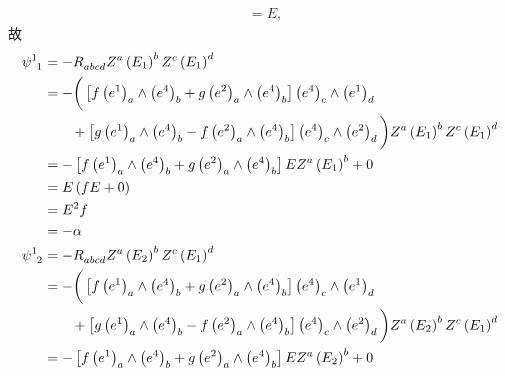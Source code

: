 \begin{xiti}
\begin{zm}
\begin{equation*}
\begin{split}
				&= E,
			\end{split}
		\end{equation*}
		故
		\begin{align*}
			\tensor{\psi}{^1_1} &= - \tensor{R}{_a_b_c_d} \tensor{Z}{^a} \tensor{\left( E_1 \right)}{^b} \tensor{Z}{^c} \tensor{\left( E_1 \right)}{^d}\\
			&= - \bigg( \left[ f \tensor{\left( e^1 \right)}{_a} \wedge \tensor{\left( e^4 \right)}{_b} + g \tensor{\left( e^2 \right)}{_a} \wedge \tensor{\left( e^4 \right)}{_b} \right] \tensor{\left( e^4 \right)}{_c} \wedge \tensor{\left( e^1 \right)}{_d}\\
			&\qquad {}+ \left[ g \tensor{\left( e^1 \right)}{_a} \wedge \tensor{\left( e^4 \right)}{_b} - f \tensor{\left( e^2 \right)}{_a} \wedge \tensor{\left( e^4 \right)}{_b} \right] \tensor{\left( e^4 \right)}{_c} \wedge \tensor{\left( e^2 \right)}{_d} \bigg) \tensor{Z}{^a} \tensor{\left( E_1 \right)}{^b} \tensor{Z}{^c} \tensor{\left( E_1 \right)}{^d}\\
			&= - \left[ f \tensor{\left( e^1 \right)}{_a} \wedge \tensor{\left( e^4 \right)}{_b} + g \tensor{\left( e^2 \right)}{_a} \wedge \tensor{\left( e^4 \right)}{_b} \right] E \tensor{Z}{^a} \tensor{\left( E_1 \right)}{^b} + 0 \\
			&= E \left( f E + 0 \right)\\
			&= E^2 f\\
			&= - \alpha\\
			\tensor{\psi}{^1_2} &= - \tensor{R}{_a_b_c_d} \tensor{Z}{^a} \tensor{\left( E_2 \right)}{^b} \tensor{Z}{^c} \tensor{\left( E_1 \right)}{^d}\\
			&= - \bigg( \left[ f \tensor{\left( e^1 \right)}{_a} \wedge \tensor{\left( e^4 \right)}{_b} + g \tensor{\left( e^2 \right)}{_a} \wedge \tensor{\left( e^4 \right)}{_b} \right] \tensor{\left( e^4 \right)}{_c} \wedge \tensor{\left( e^1 \right)}{_d}\\
			&\qquad {}+ \left[ g \tensor{\left( e^1 \right)}{_a} \wedge \tensor{\left( e^4 \right)}{_b} - f \tensor{\left( e^2 \right)}{_a} \wedge \tensor{\left( e^4 \right)}{_b} \right] \tensor{\left( e^4 \right)}{_c} \wedge \tensor{\left( e^2 \right)}{_d} \bigg) \tensor{Z}{^a} \tensor{\left( E_2 \right)}{^b} \tensor{Z}{^c} \tensor{\left( E_1 \right)}{^d}\\
			&= - \left[ f \tensor{\left( e^1 \right)}{_a} \wedge \tensor{\left( e^4 \right)}{_b} + g \tensor{\left( e^2 \right)}{_a} \wedge \tensor{\left( e^4 \right)}{_b} \right] E \tensor{Z}{^a} \tensor{\left( E_2 \right)}{^b} + 0 \\

\end{align*}
\end{zm}
\end{xiti}
